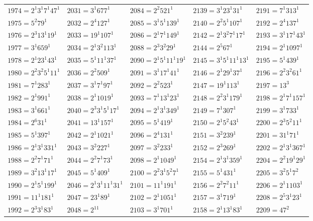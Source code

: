{\begin{longtable}[c]{*{5}{l}}
$1974=2^{1}3^{1}7^{1}47^{1}$&$2031=3^{1}677^{1}$&$2084=2^{2}521^{1}$&$2139=3^{1}23^{1}31^{1}$&$2191=7^{1}313^{1}$\\
$1975=5^{2}79^{1}$&$2032=2^{4}127^{1}$&$2085=3^{1}5^{1}139^{1}$&$2140=2^{2}5^{1}107^{1}$&$2192=2^{4}137^{1}$\\
$1976=2^{3}13^{1}19^{1}$&$2033=19^{1}107^{1}$&$2086=2^{1}7^{1}149^{1}$&$2142=2^{1}3^{2}7^{1}17^{1}$&$2193=3^{1}17^{1}43^{1}$\\
$1977=3^{1}659^{1}$&$2034=2^{1}3^{2}113^{1}$&$2088=2^{3}3^{2}29^{1}$&$2144=2^{5}67^{1}$&$2194=2^{1}1097^{1}$\\
$1978=2^{1}23^{1}43^{1}$&$2035=5^{1}11^{1}37^{1}$&$2090=2^{1}5^{1}11^{1}19^{1}$&$2145=3^{1}5^{1}11^{1}13^{1}$&$2195=5^{1}439^{1}$\\
$1980=2^{2}3^{2}5^{1}11^{1}$&$2036=2^{2}509^{1}$&$2091=3^{1}17^{1}41^{1}$&$2146=2^{1}29^{1}37^{1}$&$2196=2^{2}3^{2}61^{1}$\\
$1981=7^{1}283^{1}$&$2037=3^{1}7^{1}97^{1}$&$2092=2^{2}523^{1}$&$2147=19^{1}113^{1}$&$2197=13^{3}$\\
$1982=2^{1}991^{1}$&$2038=2^{1}1019^{1}$&$2093=7^{1}13^{1}23^{1}$&$2148=2^{2}3^{1}179^{1}$&$2198=2^{1}7^{1}157^{1}$\\
$1983=3^{1}661^{1}$&$2040=2^{3}3^{1}5^{1}17^{1}$&$2094=2^{1}3^{1}349^{1}$&$2149=7^{1}307^{1}$&$2199=3^{1}733^{1}$\\
$1984=2^{6}31^{1}$&$2041=13^{1}157^{1}$&$2095=5^{1}419^{1}$&$2150=2^{1}5^{2}43^{1}$&$2200=2^{3}5^{2}11^{1}$\\
$1985=5^{1}397^{1}$&$2042=2^{1}1021^{1}$&$2096=2^{4}131^{1}$&$2151=3^{2}239^{1}$&$2201=31^{1}71^{1}$\\
$1986=2^{1}3^{1}331^{1}$&$2043=3^{2}227^{1}$&$2097=3^{2}233^{1}$&$2152=2^{3}269^{1}$&$2202=2^{1}3^{1}367^{1}$\\
$1988=2^{2}7^{1}71^{1}$&$2044=2^{2}7^{1}73^{1}$&$2098=2^{1}1049^{1}$&$2154=2^{1}3^{1}359^{1}$&$2204=2^{2}19^{1}29^{1}$\\
$1989=3^{2}13^{1}17^{1}$&$2045=5^{1}409^{1}$&$2100=2^{2}3^{1}5^{2}7^{1}$&$2155=5^{1}431^{1}$&$2205=3^{2}5^{1}7^{2}$\\
$1990=2^{1}5^{1}199^{1}$&$2046=2^{1}3^{1}11^{1}31^{1}$&$2101=11^{1}191^{1}$&$2156=2^{2}7^{2}11^{1}$&$2206=2^{1}1103^{1}$\\
$1991=11^{1}181^{1}$&$2047=23^{1}89^{1}$&$2102=2^{1}1051^{1}$&$2157=3^{1}719^{1}$&$2208=2^{5}3^{1}23^{1}$\\
$1992=2^{3}3^{1}83^{1}$&$2048=2^{11}$&$2103=3^{1}701^{1}$&$2158=2^{1}13^{1}83^{1}$&$2209=47^{2}$\\

\end{longtable}}
